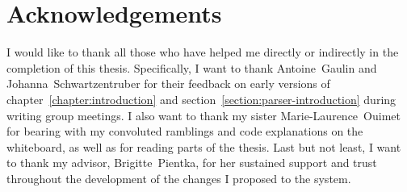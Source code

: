 \chapter*{Acknowledgements}

I would like to thank all those who have helped me directly or indirectly in the completion of this thesis.
Specifically, I want to thank Antoine~Gaulin and Johanna~Schwartzentruber for their feedback on early versions of chapter~\ref{chapter:introduction} and section~\ref{section:parser-introduction} during writing group meetings.
I also want to thank my sister Marie-Laurence~Ouimet for bearing with my convoluted ramblings and code explanations on the whiteboard, as well as for reading parts of the thesis.
Last but not least, I want to thank my advisor, Brigitte~Pientka, for her sustained support and trust throughout the development of the changes I proposed to the \Beluga system.


